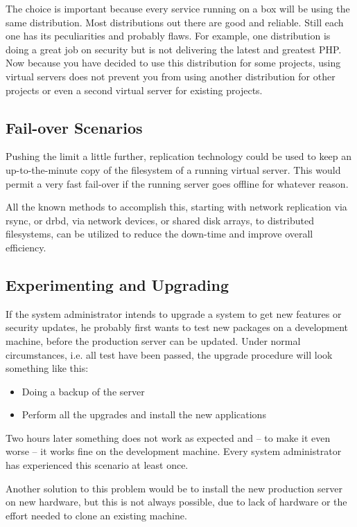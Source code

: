 The choice is important because every service running on a box will be using
the same distribution. Most distributions out there are good and reliable.
Still each one has its peculiarities and probably flaws. For example, one
distribution is doing a great job on security but is not delivering the latest
and greatest PHP. Now because you have decided to use this distribution for
some projects, using virtual servers does not prevent you from using another
distribution for other projects or even a second virtual server for existing
projects.


\subsection{Fail-over Scenarios}

Pushing the limit a little further, replication technology could be used to
keep an up-to-the-minute copy of the filesystem of a running virtual server.
This would permit a very fast fail-over if the running server goes offline for
whatever reason.

All the known methods to accomplish this, starting with network replication via
rsync, or drbd, via network devices, or shared disk arrays, to distributed
filesystems, can be utilized to reduce the down-time and improve overall
efficiency.


\subsection{Experimenting and Upgrading}

If the system administrator intends to upgrade a system to get new features or
security updates, he probably first wants to test new packages on a development
machine, before the production server can be updated. Under normal
circumstances, i.e. all test have been passed, the upgrade procedure will look
something like this:

\begin{itemize}
	\item Doing a backup of the server
	\item Perform all the upgrades and install the new applications
\end{itemize}

Two hours later something does not work as expected and -- to make it even
worse -- it works fine on the development machine. Every system administrator
has experienced this scenario at least once.

Another solution to this problem would be to install the new production server
on new hardware, but this is not always possible, due to lack of hardware or
the effort needed to clone an existing machine.

